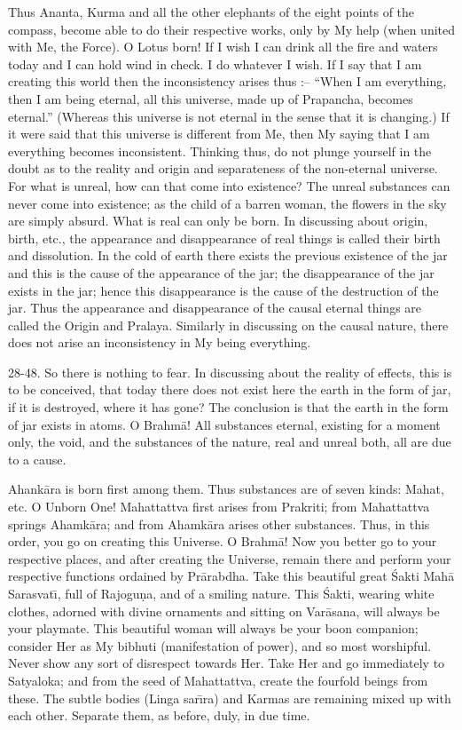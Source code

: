 Thus Ananta, Kurma and all the other elephants of the eight points of the compass, become able to do their respective works, only by My help (when united with Me, the Force). O Lotus born! If I wish I can drink all the fire and waters today and I can hold wind in check. I do whatever I wish. If I say that I am creating this world then the inconsistency arises thus :-- ``When I am everything, then I am being eternal, all this universe, made up of Prapancha, becomes eternal.'' (Whereas this universe is not eternal in the sense that it is changing.) If it were said that this universe is different from Me, then My saying that I am everything becomes inconsistent. Thinking thus, do not plunge yourself in the doubt as to the reality and origin and separateness of the non-eternal universe. For what is unreal, how can that come into existence? The unreal substances can never come into existence; as the child of a barren woman, the flowers in the sky are simply absurd. What is real can only be born. In discussing about origin, birth, etc., the appearance and disappearance of real things is called their birth and dissolution. In the cold of earth there exists the previous existence of the jar and this is the cause of the appearance of the jar; the disappearance of the jar exists in the jar; hence this disappearance is the cause of the destruction of the jar. Thus the appearance and disappearance of the causal eternal things are called the Origin and Pralaya. Similarly in discussing on the causal nature, there does not arise an inconsistency in My being everything.

28-48. So there is nothing to fear. In discussing about the reality of effects, this is to be conceived, that today there does not exist here the earth in the form of jar, if it is destroyed, where it has gone? The conclusion is that the earth in the form of jar exists in atoms. O Brahm\=a! All substances eternal, existing for a moment only, the void, and the substances of the nature, real and unreal both, all are due to a cause.

Ahank\=ara is born first among them. Thus substances are of seven kinds: Mahat, etc. O Unborn One! Mahattattva first arises from Prakriti; from Mahattattva springs Ahamk\=ara; and from Ahamk\=ara arises other substances. Thus, in this order, you go on creating this Universe. O Brahm\=a! Now you better go to your respective places, and after creating the Universe, remain there and perform your respective functions ordained by Pr\=arabdha. Take this beautiful great \'Sakti Mah\=a Sarasvat\={\i}, full of Rajogu\d{n}a, and of a smiling nature. This \'Sakti, wearing white clothes, adorned with divine ornaments and sitting on Var\=asana, will always be your playmate. This beautiful woman will always be your boon companion; consider Her as My bibhuti (manifestation of power), and so most worshipful. Never show any sort of disrespect towards Her. Take Her and go immediately to Satyaloka; and from the seed of Mahattattva, create the fourfold beings from these. The subtle bodies (Linga sar\={\i}ra) and Karmas are remaining mixed up with each other. Separate them, as before, duly, in due time.

